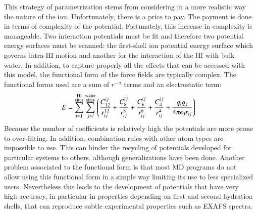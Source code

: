 This strategy of parametrization stems from considering in a more realistic way the nature of the 
ion. Unfortunately, there is a price to pay. The payment is done in terms of complexity of the 
potential. Fortunately, this increase in complexity is manageable. Two interaction potentials must 
be fit and therefore two potential energy surfaces must be scanned: the first-shell ion potential 
energy surface which governs intra-HI motion and another for the interaction of the HI with bulk 
water. In addition, to capture properly all the effects that can be accessed with this model,
the functional form of the force fields are typically complex. The functional forms used are 
a sum of $r^{-n}$ terms and an electrostatic term:
\begin{equation}
E=\sum_{i=1}^{\substack{\text{HI} \vspace{0.02cm}\\ \text{sites} }} 
\sum_{j>i}^{\substack{\text{water} \vspace{0.02cm}\\ \text{sites} } }
\left(\frac{C_{12}^{ij}}{r_{ij}^{12}}+\frac{C_{8}^{ij}}{r_{ij}^{8}}+
\frac{C_{6}^{ij}}{r_{ij}^{6}}+
\frac{C_{4}^{ij}}{r_{ij}^{4}}+
\frac{q_iq_j}{4\pi\epsilon_0 r_{ij}}\right)
\end{equation}
Because the number of coefficients is relatively high the 
potentials are more prone to over-fitting. In addition, combination rules with 
other atom types are impossible to use. This can hinder the recycling of potentials developed for 
particular systems to others, although generalizations have been 
done\cite{JACS_ESM_1999,Martinez2004,JPhysChemB_ESM_2007}. Another 
problem associated 
to the functional form is that most MD programs do not allow using this functional 
form in a simple way limiting its use to less specialized users. Nevertheless this leads to 
the development of potentials that have very high accuracy, in particular in properties 
depending on first and second hydration shells, that can reproduce subtle experimental 
properties such as EXAFS 
spectra\cite{Angew_ESM_2010,Merkling2001,JACS_ESM_2002,caralimpio2018looking,thesisNoe}.

